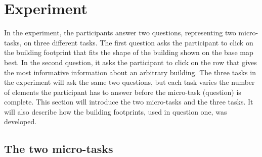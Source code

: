 \section{Experiment}\label{sec:experiment}
In the experiment, the participants answer two questions, representing two micro-tasks, on three different tasks. The first question asks the participant to click on the building footprint that fits the shape of the building shown on the base map best. In the second question, it asks the participant to click on the row that gives the most informative information about an arbitrary building. The three tasks in the experiment will ask the same two questions, but each task varies the number of elements the participant has to answer before the micro-task (question) is complete. This section will introduce the two micro-tasks and the three tasks. It will also describe how the building footprints, used in question one, was developed. 

\subsection{The two micro-tasks}\label{sec:experimentquestions}

